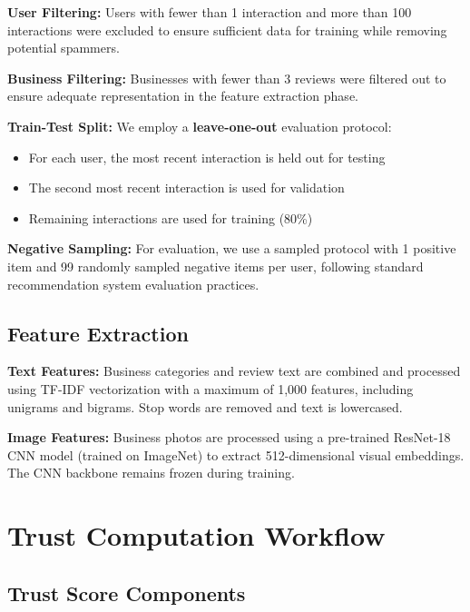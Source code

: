 \textbf{User Filtering:} Users with fewer than 1 interaction and more than 100 interactions were excluded to ensure sufficient data for training while removing potential spammers.

\textbf{Business Filtering:} Businesses with fewer than 3 reviews were filtered out to ensure adequate representation in the feature extraction phase.

\textbf{Train-Test Split:} We employ a \textbf{leave-one-out} evaluation protocol:
\begin{itemize}
    \item For each user, the most recent interaction is held out for testing
    \item The second most recent interaction is used for validation
    \item Remaining interactions are used for training (80\%)
\end{itemize}

\textbf{Negative Sampling:} For evaluation, we use a sampled protocol with 1 positive item and 99 randomly sampled negative items per user, following standard recommendation system evaluation practices.

\subsection{Feature Extraction}

\textbf{Text Features:} Business categories and review text are combined and processed using TF-IDF vectorization with a maximum of 1,000 features, including unigrams and bigrams. Stop words are removed and text is lowercased.

\textbf{Image Features:} Business photos are processed using a pre-trained ResNet-18 CNN model (trained on ImageNet) to extract 512-dimensional visual embeddings. The CNN backbone remains frozen during training.

\section{Trust Computation Workflow}
\label{app:trust_workflow}

\subsection{Trust Score Components}

